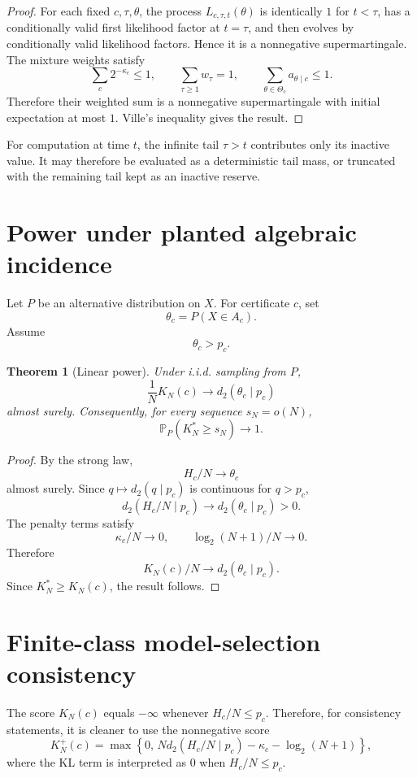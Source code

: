 \documentclass[11pt]{article}
\newtheorem{theorem}{Theorem}[section]
\begin{document}
\begin{proof}
For each fixed $c,\tau,\theta$, the process $L_{c,\tau,t}(\theta)$ is identically $1$ for $t<\tau$, has a conditionally valid first likelihood factor at $t=\tau$, and then evolves by conditionally valid likelihood factors. Hence it is a nonnegative supermartingale. The mixture weights satisfy
\[
\sum_c2^{-\kappa_c}\le1,\qquad
\sum_{\tau\ge1}w_\tau=1,\qquad
\sum_{\theta\in\Theta_c}a_{\theta\mid c}\le1.
\]
Therefore their weighted sum is a nonnegative supermartingale with initial expectation at most $1$. Ville's inequality gives the result.
\end{proof}

For computation at time $t$, the infinite tail $\tau>t$ contributes only its inactive value. It may therefore be evaluated as a deterministic tail mass, or truncated with the remaining tail kept as an inactive reserve.

\section{Power under planted algebraic incidence}

Let $P$ be an alternative distribution on $X$. For certificate $c$, set
\[
\theta_c=P(X\in A_c).
\]
Assume
\[
\theta_c>p_c.
\]

\begin{theorem}[Linear power]
Under i.i.d. sampling from $P$,
\[
\frac1N K_N(c)\to d_2(\theta_c\mid p_c)
\]
almost surely. Consequently, for every sequence $s_N=o(N)$,
\[
\mathbb P_P(K_N^*\ge s_N)\to1.
\]
\end{theorem}

\begin{proof}
By the strong law,
\[
H_c/N\to\theta_c
\]
almost surely. Since $q\mapsto d_2(q\mid p_c)$ is continuous for $q>p_c$,
\[
d_2(H_c/N\mid p_c)\to d_2(\theta_c\mid p_c)>0.
\]
The penalty terms satisfy
\[
\kappa_c/N\to0,
\qquad
\log_2(N+1)/N\to0.
\]
Therefore
\[
K_N(c)/N\to d_2(\theta_c\mid p_c).
\]
Since $K_N^*\ge K_N(c)$, the result follows.
\end{proof}

\section{Finite-class model-selection consistency}

The score $K_N(c)$ equals $-\infty$ whenever $H_c/N\le p_c$. Therefore, for consistency statements, it is cleaner to use the nonnegative score
\[
K_N^+(c)
=
\max\left\{
0,\,
N d_2(H_c/N\mid p_c)-\kappa_c-\log_2(N+1)
\right\},
\]
where the KL term is interpreted as $0$ when $H_c/N\le p_c$.
\end{document}
